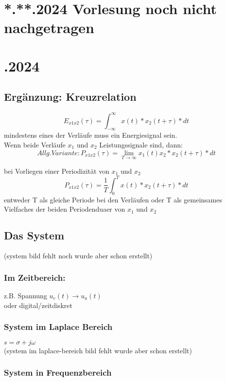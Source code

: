 \documentclass[a4paper]{article}
\begin{document}
\section*{\centering **.**.2024 Vorlesung noch nicht nachgetragen}

\newpage
\section*{.2024}
\subsection*{Ergänzung: Kreuzrelation}

\[
    E_{x1x2}(\tau)=\int_{-\infty}^{\infty}x(t)*x_2(t+\tau)*dt
\]
mindestens eines der Verläufe muss ein Energiesignal sein. \\
Wenn beide Verläufe $x_1$ und $x_2$ Leistungssignale sind, dann:
\[
    Allg. Variante: P_{x1x2}(\tau)=\lim_{T\to\infty}x_1(t)x_2*x_2(t+\tau)*dt
\]

    bei Vorliegen einer Periodizität von $x_1$ und $x_2$
\[
    P_{x1x2}(\tau)=\frac{1}{T}\int_{0}^{T}x(t)*x_2(t+\tau)*dt
\]
entweder T als gleiche Periode bei den Verläufen oder T als gemeinsames Vielfaches der beiden Periodenduaer von $x_1$ und $x_2$

\subsection*{\centering Das System}
(system bild fehlt noch wurde aber schon erstellt)

\subsubsection*{Im Zeitbereich:}
z.B. Spannung $u_e(t) \to u_a(t)$ \\
oder digital/zeitdiskret

\subsubsection*{System im Laplace Bereich}
$s=\sigma+j\omega$ \\
(system im laplace-bereich bild fehlt wurde aber schon erstellt)

\subsubsection*{System in Frequenzbereich}
\end{document}
